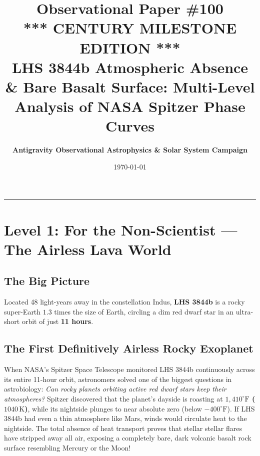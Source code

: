 \documentclass[11pt,a4paper]{article}
\title{\Huge \textbf{Observational Paper \#100} \\ \vspace{0.3em} \Large \textbf{*** CENTURY MILESTONE EDITION ***} \\ \vspace{0.5em} \Large LHS 3844b Atmospheric Absence \& Bare Basalt Surface: Multi-Level Analysis of NASA Spitzer Phase Curves}
\author{\textbf{Antigravity Observational Astrophysics \& Solar System Campaign}}
\date{\today}
\begin{document}
\maketitle

\vspace{-1em}
\begin{center}
\rule{\textwidth}{1.5pt}
\end{center}

\section*{Level 1: For the Non-Scientist — The Airless Lava World}

\subsection*{The Big Picture}
Located 48 light-years away in the constellation Indus, \textbf{LHS 3844b} is a rocky super-Earth $1.3$ times the size of Earth, circling a dim red dwarf star in an ultra-short orbit of just \textbf{11 hours}.

\subsection*{The First Definitively Airless Rocky Exoplanet}
When NASA's Spitzer Space Telescope monitored LHS 3844b continuously across its entire 11-hour orbit, astronomers solved one of the biggest questions in astrobiology: \textit{Can rocky planets orbiting active red dwarf stars keep their atmospheres?}
Spitzer discovered that the planet's dayside is roasting at \textbf{$1{,}410^\circ\text{F}$ ($1040\,\text{K}$)}, while its nightside plunges to near absolute zero (below $-400^\circ\text{F}$). If LHS 3844b had even a thin atmosphere like Mars, winds would circulate heat to the nightside. The total absence of heat transport proves that stellar stellar flares have stripped away all air, exposing a completely bare, dark volcanic basalt rock surface resembling Mercury or the Moon!

\newpage

\end{document}
